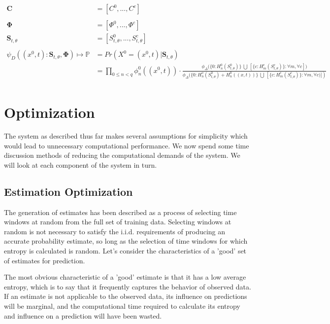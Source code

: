 \documentclass[11pt,titlepage]{article}
\begin{document}
\[ 
\begin{align}
\mathbf{C} &= [C^0,...,C^c] \\
\\
\mathbf{\Phi} &= [\Phi^0,...,\Phi^c] \\
\mathbf{S}_{t,\theta} &= [ S_{t,\theta}^0,...,S_{t,\theta}^c] \\
\\
\psi_D((x^0,t):\mathbf{S}_{t,\theta},\mathbf{\Phi}) \mapsto \mathbb{P} &= Pr( X^0 = (x^0,t) | \mathbf{S}_{t,\theta} ) \\
&= \prod_{ 0 \le n < q} \phi_n^0((x^0,t)) \cdot \frac
{ \phi_\Delta \bigg( \Big\{ 0:H_n^0(S_{t,\theta}^0) \Big\} \ \bigcup \ \left [ \Big\{ c: H_m^c(S_{t,\theta}^c ) \Big\} : \forall m, \forall c \right ] \bigg) }
{ \phi_\Delta \bigg( \Big\{ 0: H_n^o(S_{t,\theta}^0) + H_n^0((x,t)) \Big\} \ \bigcup \ \left [ \Big\{c:H_m^c(S_{t,\theta}^c) \Big\} : \forall m, \forall c ) \bigg] \right ) }  \\
\end{align}
\]

\section{Optimization}
The system as described thus far makes several assumptions for simplicity which would lead to unnecessary computational performance.  We now spend some time discussion methods of reducing the computational demands of the system.  We will look at each component of the system in turn.

\subsection{Estimation Optimization}
The generation of estimates has been described as a process of selecting time windows at random from the full set of training data.  Selecting windows at random is not necessary to satisfy the i.i.d. requirements of producing an accurate probability estimate, so long as the selection of time windows for which entropy is calculated is random.  Let's consider the characteristics of a 'good' set of estimates for prediction.  

The most obvious characteristic of a 'good' estimate is that it has a low average entropy, which is to say that it frequently captures the behavior of observed data.  If an estimate is not applicable to the observed data, its influence on predictions will be marginal, and the computational time required to calculate its entropy and influence on a prediction will have been wasted.  
\end{document}
